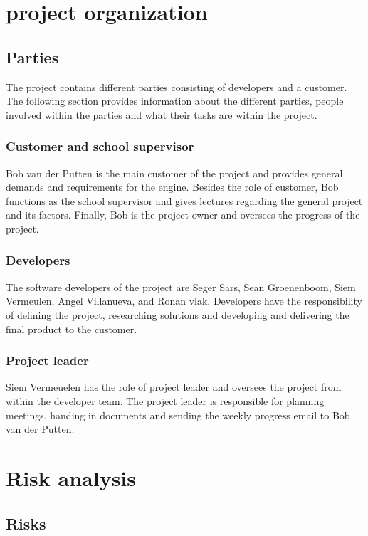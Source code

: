 \documentclass{article} %
\begin{document}
\section{project organization}

\subsection{Parties}
The project contains different parties consisting of developers and a customer.
The following section provides information about the different parties, people involved within the parties and what their tasks are within the project.

\subsubsection{Customer and school supervisor}
Bob van der Putten is the main customer of the project and provides general demands and requirements for the engine.
Besides the role of customer, Bob functions as the school supervisor and gives lectures regarding the general project and its factors.
Finally, Bob is the project owner and oversees the progress of the project.


\subsubsection{Developers}
The software developers of the project are Seger Sars, Sean Groenenboom, Siem Vermeulen, Angel Villanueva, and Ronan vlak.
Developers have the responsibility of defining the project, researching solutions and developing and delivering the final product to the customer.


\subsubsection{Project leader}
Siem Vermeuelen has the role of project leader and oversees the project from within the developer team.
The project leader is responsible for planning meetings, handing in documents and sending the weekly progress email to Bob van der Putten.


\newpage

\section{Risk analysis}

\subsection{Risks}
\end{document}
